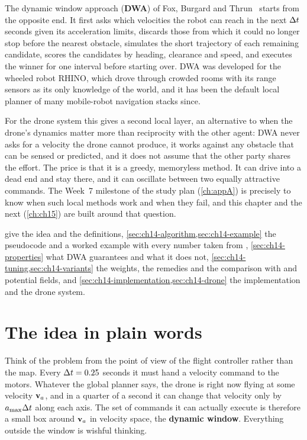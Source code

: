 The dynamic window approach
(\textbf{DWA}) of Fox, Burgard and Thrun~\cite{fox1997dwa} starts
from the opposite end. It first asks which velocities the robot can reach in
the next $\Delta t$ seconds given its acceleration limits, discards those from
which it could no longer stop before the nearest obstacle, simulates the
short trajectory of each remaining candidate, scores the candidates by
heading, clearance and speed, and executes the winner for one interval before
starting over. DWA was developed for the wheeled robot RHINO, which drove
through crowded rooms with its range sensors as its only knowledge of
the world, and it has been the default local planner of many mobile-robot
navigation stacks since.

For the drone system this gives a second local layer, an alternative to \orca
when the drone's dynamics matter more than reciprocity with the other agent:
DWA never asks for a velocity the drone cannot produce, it works against any
obstacle that can be sensed or predicted, and it does not assume that the
other party shares the effort. The price is that it is a greedy, memoryless
method. It can drive into a dead end and stay there, and it can oscillate
between two equally attractive commands. The Week~7 milestone of the study
plan (\cref{ch:appA}) is precisely to know when such local methods work and
when they fail, and this chapter and the next (\cref{ch:ch15}) are built
around that question.

 give the idea and the definitions,
\cref{sec:ch14-algorithm,sec:ch14-example} the pseudocode and a worked
example with every number taken from ,
\cref{sec:ch14-properties} what DWA guarantees and what it does not,
\cref{sec:ch14-tuning,sec:ch14-variants} the weights, the remedies and the
comparison with \orca and potential fields, and
\cref{sec:ch14-implementation,sec:ch14-drone} the implementation and the
drone system.

\section{The idea in plain words}
\label{sec:ch14-intuition}

Think of the problem from the point of view of the flight controller rather
than the map. Every $\Delta t = 0.25$ seconds it must hand a velocity command to the
motors. Whatever the global planner says, the drone is right now flying at
some velocity $\mathbf{v}_a$, and in a quarter of a second it can change that
velocity only by $a_{\max}\Delta t$ along each axis. The set of commands it can
actually execute is therefore a small box around $\mathbf{v}_a$ in velocity space,
the \textbf{dynamic window}. Everything outside the
window is wishful thinking.

